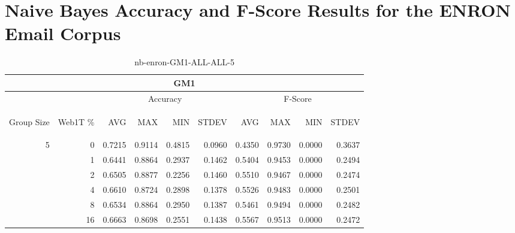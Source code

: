 \chapter{Naive Bayes Accuracy and F-Score Results for the ENRON Email Corpus}

\begin{center}
\begin{table}[htbp] 
 \begin{center}
\begin{tabular}{ | r | r | r | r | r | r | r | r | r | r |}
\hline
\multicolumn{10}{|c|}{GM1}\\
\hline
 & & \multicolumn{4}{|c|}{Accuracy} & \multicolumn{4}{|c|}{F-Score}\\ \cline{3-10}
\begin{sideways}Group Size\end{sideways} & \begin{sideways}Web1T \%\end{sideways} & \begin{sideways}AVG\end{sideways} & \begin{sideways}MAX\end{sideways} & \begin{sideways}MIN\end{sideways} & \begin{sideways}STDEV\end{sideways} & \begin{sideways}AVG\end{sideways} & \begin{sideways}MAX\end{sideways} & \begin{sideways}MIN\end{sideways} & \begin{sideways}STDEV\end{sideways}\\
\hline
\multirow{5}{*}{5}
 & 0 & 0.7215 & 0.9114 & 0.4815 & 0.0960 & 0.4350 & 0.9730 & 0.0000 & 0.3637\\ \cline{2-10}
 & 1 & 0.6441 & 0.8864 & 0.2937 & 0.1462 & 0.5404 & 0.9453 & 0.0000 & 0.2494\\ \cline{2-10}
 & 2 & 0.6505 & 0.8877 & 0.2256 & 0.1460 & 0.5510 & 0.9467 & 0.0000 & 0.2474\\ \cline{2-10}
 & 4 & 0.6610 & 0.8724 & 0.2898 & 0.1378 & 0.5526 & 0.9483 & 0.0000 & 0.2501\\ \cline{2-10}
 & 8 & 0.6534 & 0.8864 & 0.2950 & 0.1387 & 0.5461 & 0.9494 & 0.0000 & 0.2482\\ \cline{2-10}
 & 16 & 0.6663 & 0.8698 & 0.2551 & 0.1438 & 0.5567 & 0.9513 & 0.0000 & 0.2472\\ \cline{2-10}
\hline
\end{tabular}
\caption{nb-enron-GM1-ALL-ALL-5}
\label{table:nb-enron-GM1-ALL-ALL-5}
\end{center}
 \end{table}
\end{center}

